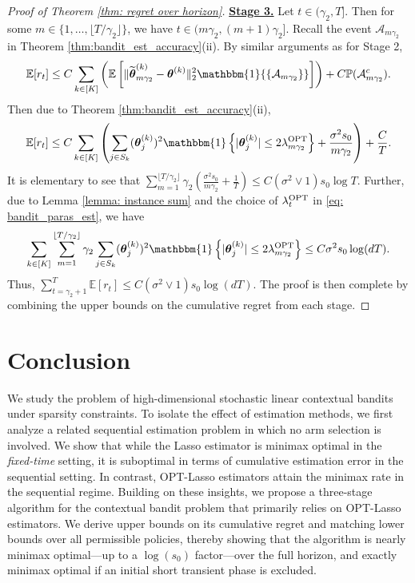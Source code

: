 \documentclass[aos,preprint]{imsart}
\theoremstyle{plain}
\theoremstyle{definition}
\newcommand{\btheta}{\boldsymbol{\theta}}
\newcommand{\idf}{\mathbbm{1}}
\newcommand{\tbtheta}{\widetilde{\boldsymbol{\theta}}}
\newcommand{\hdlambda}{\lambda^{\textup{OPT}}}
\newcommand{\cA}{\mathcal{A}}
\newcommand{\Exp}{\mathbb{E}}
\newcommand{\Pro}{\mathbb{P}}
\begin{document}
\begin{proof}[Proof of Theorem \ref{thm: regret over horizon}]
\medskip
\noindent \underline{\textbf{Stage 3.}} 
Let $t \in (\gamma_2,T]$. Then for some $m \in \{1,\ldots, \lfloor T/\gamma_2\rfloor\}$, we have $t \in (m\gamma_2,(m+1)\gamma_2]$.   Recall the event $\mathcal{A}_{m\gamma_2}$ in Theorem \ref{thm:bandit_est_accuracy}(ii). 
By similar arguments as for Stage 2,  
\begin{align*}
    \Exp[r_t]  \le C\sum_{k\in[K]}\left( \Exp\left[\|\tbtheta_{m\gamma_2}^{(k)}-\btheta^{(k)}\|_2^2\idf{\{\mathcal{A}_{m\gamma_2}\}}\right]\right)  +  C \Pro(\cA_{m\gamma_2}^c).
\end{align*}
Then due to Theorem \ref{thm:bandit_est_accuracy}(ii),
\begin{align*}
    \Exp[r_t]  \le  C\sum_{k\in[K]}\left(\sum_{j\in S_k} (\btheta^{(k)}_j)^2 \idf\left\{|\btheta^{(k)}_j| \le 2\hdlambda_{m\gamma_2} \right\} + \frac{\sigma^2 s_0}{m\gamma_2}   \right) + \frac{C}{T} .
\end{align*}
It is elementary to see that
$\sum_{m=1}^{\lfloor T/\gamma_2\rfloor} \gamma_2 \left( \frac{\sigma^2 s_0}{m\gamma_2} + \frac{1}{T} \right) \leq C (\sigma^2 \vee 1) s_0 \log T$. 
Further, due to Lemma \ref{lemma: instance sum} and the choice of $\hdlambda_t$ in \eqref{eq: bandit_paras_est}, we have
$$
 \sum_{k\in[K]} \sum_{m=1}^{\lfloor T/\gamma_2\rfloor} \gamma_2\sum_{j\in S_k} (\btheta^{(k)}_j)^2 \idf\left\{|\btheta^{(k)}_j| \le 2\hdlambda_{m\gamma_2}\right\} \leq C \sigma^2 s_0 \log(dT).
$$
Thus, $\sum_{t = \gamma_2+1}^{T} \Exp[r_t] \leq C (\sigma^2 \vee 1) s_0\log(dT)$. The proof is then complete by combining the upper bounds on the cumulative regret from each stage.
\end{proof}






\section{Conclusion} \label{sec:conclusion}
We study the problem of high-dimensional stochastic linear contextual bandits under sparsity constraints. To isolate the effect of estimation methods, we first analyze a related sequential estimation problem in which no arm selection is involved. We show that while the Lasso estimator is minimax optimal in the \textit{fixed-time} setting, it is suboptimal in terms of cumulative estimation error in the sequential setting. In contrast, OPT-Lasso estimators attain the minimax rate in the sequential regime. Building on these insights, we propose a three-stage algorithm for the contextual bandit problem that primarily relies on OPT-Lasso estimators. We derive upper bounds on its cumulative regret and matching lower bounds over all permissible policies, thereby showing that the algorithm is nearly minimax optimal---up to a $\log(s_0)$ factor---over the full horizon, and exactly minimax optimal if an initial short transient phase is excluded.
\end{document}
